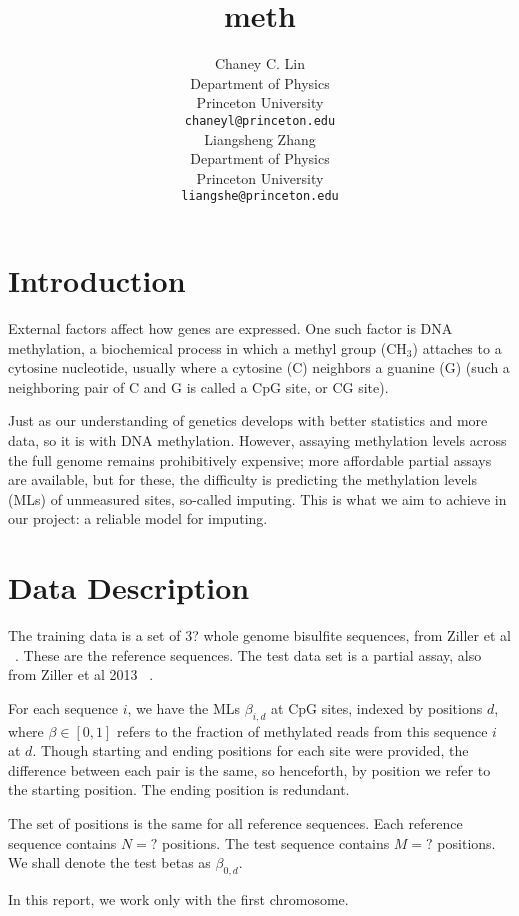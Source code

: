 \documentclass{article} %
\title{meth}
\author{
Chaney C. Lin\\
Department of Physics\\
Princeton University\\
\texttt{chaneyl@princeton.edu} \\
\And
Liangsheng Zhang\\
Department of Physics\\
Princeton University\\
\texttt{liangshe@princeton.edu} \\
}
\begin{document}
\maketitle

\begin{abstract}
\end{abstract}
\section{Introduction}

External factors affect how genes are expressed. One such factor is DNA methylation, a biochemical process in which a methyl group (CH$_3$) attaches to a cytosine nucleotide, usually where a cytosine (C) neighbors a guanine (G) (such a neighboring pair of C and G is called a CpG site, or CG site).

Just as our understanding of genetics develops with better statistics and more data, so it is with DNA methylation. However, assaying methylation levels across the full genome remains prohibitively expensive; more affordable partial assays are available, but for these, the difficulty is predicting the methylation levels (MLs) of unmeasured sites, so-called imputing. This is what we aim to achieve in our project: a reliable model for imputing.

\section{Data Description}

The training data is a set of 3? whole genome bisulfite sequences, from Ziller et al ~\cite{ziller2013charting}. These are the reference sequences. The test data set is a partial assay, also from Ziller et al 2013 ~\cite{ziller2013charting}.

For each sequence $i$, we have the MLs $\beta_{i,d}$ at CpG sites, indexed by positions $d$, where $\beta \in [0,1]$ refers to the fraction of methylated reads from this sequence $i$ at $d$. Though starting and ending positions for each site were provided, the difference between each pair is the same, so henceforth, by position we refer to the starting position. The ending position is redundant.

The set of positions is the same for all reference sequences. Each reference sequence contains $N=?$ positions. The test sequence contains $M=?$ positions. We shall denote the test betas as $\beta_{0,d}$.

In this report, we work only with the first chromosome.
\end{document}
